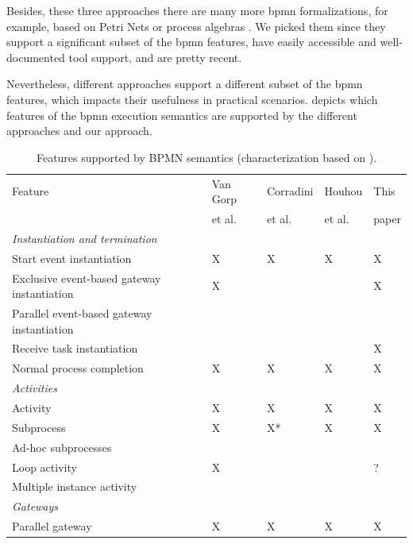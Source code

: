 \documentclass[adraft, copyright, creativecommons]{eptcs} %
\begin{document}
Besides, these three approaches there are many more \gls*{bpmn} formalizations, for example, based on Petri Nets \cite{dijkmanSemanticsAnalysisBusiness2008} or process algebras \cite{wongProcessSemanticsBPMN2008}.
We picked them since they support a significant subset of the \gls*{bpmn} features, have easily accessible and well-documented tool support, and are pretty recent.

Nevertheless, different approaches support a different subset of the \gls*{bpmn} features, which impacts their usefulness in practical scenarios.
 depicts which features of the \gls*{bpmn} execution semantics are supported by the different approaches and our approach.

\begin{table}[htbp]
    \caption{Features supported by BPMN semantics (characterization based on \cite{vangorpVisualTokenbasedFormalization2013}).}
    \label{tab:supportedFeatures}
    \begin{tabular}{l l l l l}
    \hline
      Feature & Van Gorp &  Corradini & Houhou & This\\
      & et al. \cite{vangorpVisualTokenbasedFormalization2013} & et al. \cite{corradiniFormalApproachAnalysis2021}& et al. \cite{houhouFirstOrderLogicVerification2022} & paper\\
      \hline
      \textit{Instantiation and termination} & &\\
      Start event instantiation & X & X & X & X\\
      Exclusive event-based gateway instantiation & X & & & X\\
      Parallel event-based gateway instantiation &  & & & \\
      Receive task instantiation & & & & X\\
      Normal process completion & X & X & X & X\\
      \textit{Activities} & & & &\\
      Activity & X & X & X & X\\
      Subprocess & X & X* & X & X\\
      Ad-hoc subprocesses & & & &\\
      Loop activity & X & & & ?\\
      Multiple instance activity & & & & \\
      \textit{Gateways} & & & &\\
      Parallel gateway & X & X & X & X\\

\end{tabular}
\end{table}
\end{document}
